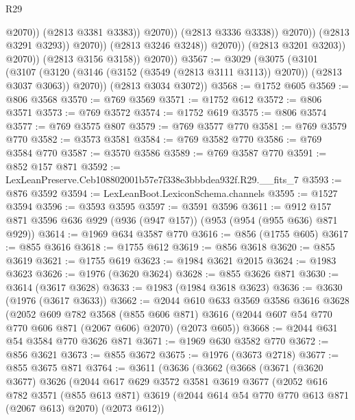 \begin{lexlean}{R29}
\begin{coremodule}
                                            @2070))
                                        (@2813 @3381 @3383))
                                      @2070))
                                  (@2813 @3336 @3338))
                                @2070))
                            (@2813 @3291 @3293))
                          @2070))
                      (@2813 @3246 @3248))
                    @2070))
                (@2813 @3201 @3203))
              @2070))
          (@2813 @3156 @3158))
        @2070))
@3567 := @3029
    (@3075
      (@3101
        (@3107 (@3120 (@3146 (@3152 (@3549 (@2813 @3111 @3113)) @2070)) (@2813 @3037 @3063)) @2070))
      (@2813 @3034 @3072))
@3568 := @1752 @605
@3569 := @806 @3568
@3570 := @769 @3569
@3571 := @1752 @612
@3572 := @806 @3571
@3573 := @769 @3572
@3574 := @1752 @619
@3575 := @806 @3574
@3577 := @769 @3575 @807
@3579 := @769 @3577 @770
@3581 := @769 @3579 @770
@3582 := @3573 @3581
@3584 := @769 @3582 @770
@3586 := @769 @3584 @770
@3587 := @3570 @3586
@3589 := @769 @3587 @770
@3591 := @852 @157 @871
@3592 := LexLeanPreserve.Ceb108802001b57e7f338e3bbbdea932f.R29.__fits_7
@3593 := @876 @3592
@3594 := LexLeanBoot.LexiconSchema.channels
@3595 := @1527 @3594
@3596 := @3593 @3595
@3597 := @3591 @3596
@3611 := @912 @157 @871 @3596 @636 @929 (@936 (@947 @157)) (@953 (@954 (@955 @636) @871 @929))
@3614 := @1969 @634 @3587 @770
@3616 := @856 (@1755 @605)
@3617 := @855 @3616
@3618 := @1755 @612
@3619 := @856 @3618
@3620 := @855 @3619
@3621 := @1755 @619
@3623 := @1984 @3621 @2015
@3624 := @1983 @3623
@3626 := @1976 (@3620 @3624)
@3628 := @855 @3626 @871
@3630 := @3614 (@3617 @3628)
@3633 := @1983 (@1984 @3618 @3623)
@3636 := @3630 (@1976 (@3617 @3633))
@3662 := @2044
    @610
    @633
    @3569
    @3586
    @3616
    @3628
    (@2052
      @609
      @782
      @3568
      (@855 @606 @871)
      @3616
      (@2044 @607 @54 @770 @770 @606 @871 (@2067 @606) @2070)
      (@2073 @605))
@3668 := @2044 @631 @54 @3584 @770 @3626 @871
@3671 := @1969 @630 @3582 @770
@3672 := @856 @3621
@3673 := @855 @3672
@3675 := @1976 (@3673 @2718)
@3677 := @855 @3675 @871
@3764 := @3611
    (@3636
      (@3662
        (@3668
          (@3671
            (@3620 @3677)
            @3626
            (@2044
              @617
              @629
              @3572
              @3581
              @3619
              @3677
              (@2052
                @616
                @782
                @3571
                (@855 @613 @871)
                @3619
                (@2044 @614 @54 @770 @770 @613 @871 (@2067 @613) @2070)
                (@2073 @612))

\end{coremodule}
\end{lexlean}
